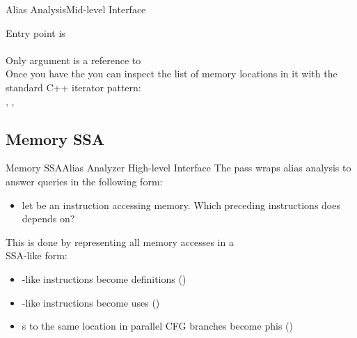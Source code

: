 \begin{frame}{Alias Analysis}{Mid-level Interface}
\begin{center}
Entry point is\\
\\
\medskip
Only argument is a reference to\\
\vfill
Once you have the  you can inspect
the list of memory locations in it with the standard C++ iterator pattern:\\
\medskip
{}, , 
\end{center}
\vfill
\end{frame}


\subsection{Memory SSA}


\begin{frame}{Memory SSA}{Alias Analyzer High-level Interface}
The  pass wraps alias analysis to answer
queries in the following form:

\begin{itemize}
\item let  be an instruction accessing memory. Which
      preceding instructions does  depends on?
\end{itemize}

\vfill
This is done by representing all memory accesses in a\\\alert{SSA-like form}:
\begin{itemize}
\item {}-like instructions become \alert{definitions} ()
\item {}-like instructions become \alert{uses} ()
\item {}s to the same location in parallel CFG branches become \alert{phi}s ()
\end{itemize}
\end{frame}


